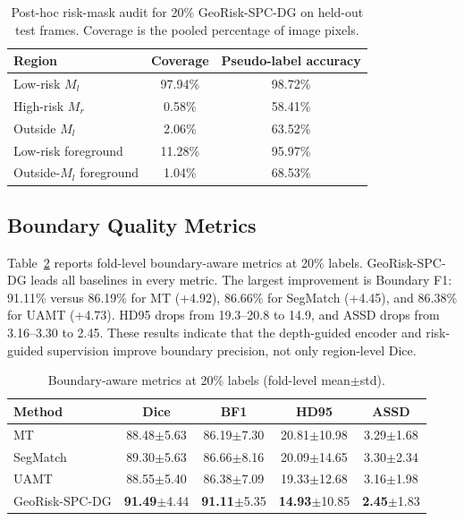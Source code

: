 \documentclass[journal]{IEEEtran}
\begin{document}
\begin{table}[t]
\caption{Post-hoc risk-mask audit for 20\% GeoRisk-SPC-DG on held-out test frames. Coverage is the pooled percentage of image pixels.}
\label{tab:risk_diag}
\centering
\scriptsize
\begin{tabular}{lcc}
\toprule
Region & Coverage & Pseudo-label accuracy \\
\midrule
Low-risk $M_l$ & 97.94\% & 98.72\% \\
High-risk $M_r$ & 0.58\% & 58.41\% \\
Outside $M_l$ & 2.06\% & 63.52\% \\
Low-risk foreground & 11.28\% & 95.97\% \\
Outside-$M_l$ foreground & 1.04\% & 68.53\% \\
\bottomrule
\end{tabular}
\end{table}

\subsection{Boundary Quality Metrics}
Table~\ref{tab:boundary} reports fold-level boundary-aware metrics at 20\% labels. GeoRisk-SPC-DG leads all baselines in every metric. The largest improvement is Boundary F1: 91.11\% versus 86.19\% for MT (+4.92), 86.66\% for SegMatch (+4.45), and 86.38\% for UAMT (+4.73). HD95 drops from 19.3--20.8 to 14.9, and ASSD drops from 3.16--3.30 to 2.45. These results indicate that the depth-guided encoder and risk-guided supervision improve boundary precision, not only region-level Dice.

\begin{table}[t]
\caption{Boundary-aware metrics at 20\% labels (fold-level mean$\pm$std).}
\label{tab:boundary}
\centering
\scriptsize
\begin{tabular}{lcccc}
\toprule
Method & Dice & BF1 & HD95 & ASSD \\
\midrule
MT & 88.48{\tiny$\pm$5.63} & 86.19{\tiny$\pm$7.30} & 20.81{\tiny$\pm$10.98} & 3.29{\tiny$\pm$1.68} \\
SegMatch & 89.30{\tiny$\pm$5.63} & 86.66{\tiny$\pm$8.16} & 20.09{\tiny$\pm$14.65} & 3.30{\tiny$\pm$2.34} \\
UAMT & 88.55{\tiny$\pm$5.40} & 86.38{\tiny$\pm$7.09} & 19.33{\tiny$\pm$12.68} & 3.16{\tiny$\pm$1.98} \\
\midrule
GeoRisk-SPC-DG & \textbf{91.49}{\tiny$\pm$4.44} & \textbf{91.11}{\tiny$\pm$5.35} & \textbf{14.93}{\tiny$\pm$10.85} & \textbf{2.45}{\tiny$\pm$1.83} \\
\bottomrule
\end{tabular}
\end{table}
\end{document}

